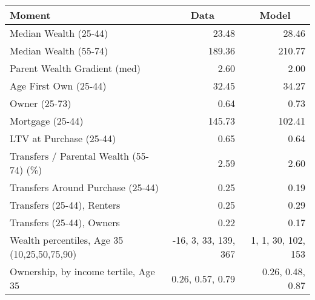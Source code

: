 \begin{tabular}{lrr}
\toprule
\multicolumn{1}{l}{Moment} & \multicolumn{1}{c}{Data} & \multicolumn{1}{c}{Model}\\
\midrule
Median Wealth (25-44) & 23.48 & 28.46\\
Median Wealth (55-74) & 189.36 & 210.77\\
Parent Wealth Gradient (med) & 2.60 & 2.00\\
Age First Own (25-44) & 32.45 & 34.27\\
Owner (25-73) & 0.64 & 0.73\\
Mortgage (25-44) & 145.73 & 102.41\\
LTV at Purchase (25-44) & 0.65 & 0.64\\
Transfers / Parental Wealth (55-74) (\%) & 2.59 & 2.60\\
Transfers Around Purchase (25-44) & 0.25 & 0.19\\
Transfers (25-44), Renters & 0.25 & 0.29\\
Transfers (25-44), Owners & 0.22 & 0.17\\
Wealth percentiles, Age 35 (10,25,50,75,90) & -16, 3, 33, 139, 367 & 1, 1, 30, 102, 153  \\ 
Ownership, by income tertile, Age 35 & 0.26, 0.57, 0.79 & 0.26, 0.48, 0.87  \\ 
\bottomrule
\end{tabular}
